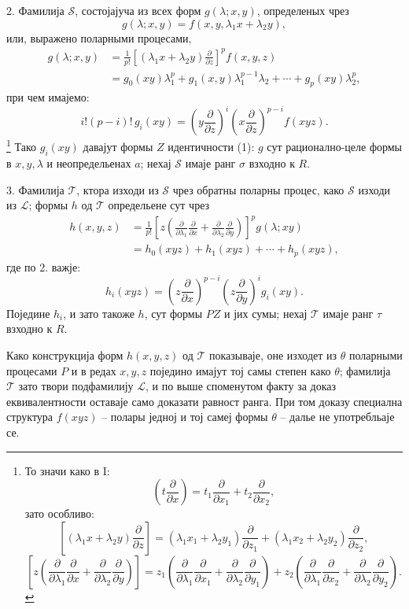 \documentclass[11pt]{article}
\begin{document}
2. Фамилија $\mathcal S$, состојајуча из всех форм $g(\lambda;x,y)$, определеных чрез
\[
  g(\lambda;x,y)=f(x,y,\lambda_1x+\lambda_2y),
\]
или, выражено поларными процесами,
\[
\begin{aligned}
  g(\lambda;x,y)
  &=\frac1{p!}\left[(\lambda_1x+\lambda_2y)\frac{\partial}{\partial z}\right]^p f(x,y,z) \\
  &=g_0(xy)\lambda_1^p+g_1(x,y)\lambda_1^{p-1}\lambda_2+\cdots+g_p(xy)\lambda_2^p,
\end{aligned}
\]
при чем имајемо:
\[
  i!(p-i)!\,g_i(xy)=
  \left(y\frac{\partial}{\partial z}\right)^i
  \left(x\frac{\partial}{\partial z}\right)^{p-i}f(xyz).
\]
\footnote{То значи како в I:
\[
 \left(t\frac{\partial}{\partial x}\right)=t_1\frac{\partial}{\partial x_1}+t_2\frac{\partial}{\partial x_2},
\]
зато особливо:
\[
 \left[(\lambda_1x+\lambda_2y)\frac{\partial}{\partial z}\right]
 = (\lambda_1x_1+\lambda_2y_1)\frac{\partial}{\partial z_1}
 + (\lambda_1x_2+\lambda_2y_2)\frac{\partial}{\partial z_2},
\]
\[
 \left[z\left(\frac{\partial}{\partial\lambda_1}\frac{\partial}{\partial x}
 +\frac{\partial}{\partial\lambda_2}\frac{\partial}{\partial y}\right)\right]
 =z_1\left(\frac{\partial}{\partial\lambda_1}\frac{\partial}{\partial x_1}
 +\frac{\partial}{\partial\lambda_2}\frac{\partial}{\partial y_1}\right)
 +z_2\left(\frac{\partial}{\partial\lambda_1}\frac{\partial}{\partial x_2}
 +\frac{\partial}{\partial\lambda_2}\frac{\partial}{\partial y_2}\right).
\]}
Тако $g_i(xy)$ давајут формы $Z$ идентичности (1): $g$ сут рационално-целе формы в $x,y,\lambda$ и неопредельенах $a$; нехај $\mathcal S$ имаје ранг $\sigma$ взходно к $R$.

3. Фамилија $\mathcal T$, ктора изходи из $\mathcal S$ чрез обратны поларны процес, како $\mathcal S$ изходи из $\mathcal L$; формы $h$ од $\mathcal T$ определьене сут чрез
\[
\begin{aligned}
 h(x,y,z)
 &=\frac1{p!}\left[z\left(\frac{\partial}{\partial\lambda_1}\frac{\partial}{\partial x}
 +\frac{\partial}{\partial\lambda_2}\frac{\partial}{\partial y}\right)\right]^p g(\lambda;xy)\\
 &=h_0(xyz)+h_1(xyz)+\cdots+h_p(xyz),
\end{aligned}
\]
где по 2. важје:
\[
  h_i(xyz)=
  \left(z\frac{\partial}{\partial x}\right)^{p-i}
  \left(z\frac{\partial}{\partial y}\right)^i g_i(xy).
\]
Поједине $h_i$, и зато такоже $h$, сут формы $PZ$ и јих сумы; нехај $\mathcal T$ имаје ранг $\tau$ взходно к $R$.

Како конструкција форм $h(x,y,z)$ од $\mathcal T$ показываје, оне изходет из $\theta$ поларными процесами $P$ и в редах $x,y,z$ поједино имајут тој самы степен како $\theta$; фамилија $\mathcal T$ зато твори подфамилију $\mathcal L$, и по выше споменутом факту за доказ еквивалентности оставаје само доказати равност ранга. При том доказу специална структура $f(xyz)$ -- полары једној и тој самеј формы $\theta$ -- далье не употребльаје се.
\end{document}
